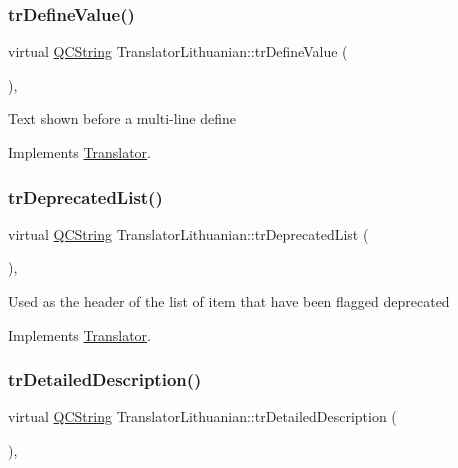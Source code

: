 \subsubsection{\texorpdfstring{trDefineValue()}{trDefineValue()}}
{\footnotesize\ttfamily virtual \mbox{\hyperlink{class_q_c_string}{Q\+C\+String}} Translator\+Lithuanian\+::tr\+Define\+Value (\begin{DoxyParamCaption}{ }\end{DoxyParamCaption})\hspace{0.3cm}{\ttfamily [inline]}, {\ttfamily [virtual]}}

Text shown before a multi-\/line define 

Implements \mbox{\hyperlink{class_translator}{Translator}}.

\mbox{\label{class_translator_lithuanian_a652c1f9986b803a6f1ad784da4559727}} 
\subsubsection{\texorpdfstring{trDeprecatedList()}{trDeprecatedList()}}
{\footnotesize\ttfamily virtual \mbox{\hyperlink{class_q_c_string}{Q\+C\+String}} Translator\+Lithuanian\+::tr\+Deprecated\+List (\begin{DoxyParamCaption}{ }\end{DoxyParamCaption})\hspace{0.3cm}{\ttfamily [inline]}, {\ttfamily [virtual]}}

Used as the header of the list of item that have been flagged deprecated 

Implements \mbox{\hyperlink{class_translator}{Translator}}.

\mbox{\label{class_translator_lithuanian_a43c7465b39b1259bf70a13f3853c9d12}} 
\subsubsection{\texorpdfstring{trDetailedDescription()}{trDetailedDescription()}}
{\footnotesize\ttfamily virtual \mbox{\hyperlink{class_q_c_string}{Q\+C\+String}} Translator\+Lithuanian\+::tr\+Detailed\+Description (\begin{DoxyParamCaption}{ }\end{DoxyParamCaption})\hspace{0.3cm}{\ttfamily [inline]}, {\ttfamily [virtual]}}


